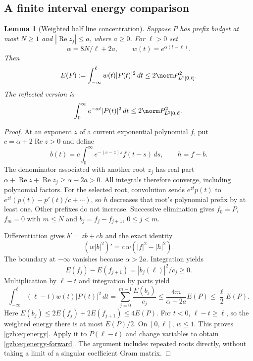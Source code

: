 \documentclass[11pt,a4paper]{article}
\numberwithin{equation}{section}
\newtheorem{lemma}[theorem]{Lemma}
\theoremstyle{definition}\newtheorem{definition}[theorem]{Definition}
\theoremstyle{remark}\newtheorem{remark}[theorem]{Remark}
\DeclareMathOperator{\Rea}{Re}\DeclareMathOperator{\Ima}{Im}
\begin{document}
\subsection{A finite interval energy comparison}
\begin{lemma}[Weighted half line concentration]\label{gzb:lem:energy}
Suppose $P$ has prefix budget at most $N\ge1$ and $|\Rea z_j|\le a$,
where $a\ge0$. For $\ell>0$ set
\[
 \alpha=8N/\ell+2a,\qquad w(t)=e^{\alpha(t-\ell)}.
\]
Then
\begin{equation}\label{gzb:eq:energy}
 E(P):=\int_{-\infty}^{\ell}w(t)|P(t)|^2\,dt
       \le2\norm P_{L^2[0,\ell]}^2.
\end{equation}
The reflected version is
\begin{equation}\label{gzb:eq:energy-forward}
 \int_0^\infty e^{-\alpha t}|P(t)|^2\,dt
       \le2\norm P_{L^2[0,\ell]}^2.
\end{equation}
\end{lemma}
\begin{proof}
At an exponent $z$ of a current exponential polynomial $f$, put
$c=\alpha+2\Rea z>0$ and define
\[
 b(t)=c\int_0^\infty e^{-(c-z)s}f(t-s)\,ds,\qquad h=f-b.
\]
The denominator associated with another root $z_j$ has real part
$\alpha+\Rea z+\Rea z_j\ge\alpha-2a>0$.
All integrals therefore converge, including polynomial factors.
For the selected root, convolution sends $e^{zt}p(t)$ to
$e^{zt}(p(t)-p'(t)/c+\cdots)$, so $h$ decreases that root's polynomial
prefix by at least one. Other prefixes do not increase.
Successive elimination gives $f_0=P$, $f_m=0$ with $m\le N$ and
$b_j=f_j-f_{j+1}$, $0\le j<m$.

Differentiation gives $b'=zb+ch$ and the exact identity
\begin{equation}\label{gzb:eq:energy-identity}
 (w|b|^2)'=c\,w(|f|^2-|h|^2).
\end{equation}
The boundary at $-\infty$ vanishes because $\alpha>2a$.
Integration yields
\[
 E(f_j)-E(f_{j+1})=|b_j(\ell)|^2/c_j\ge0.
\]
Multiplication by $\ell-t$ and integration by parts yield
\[
 \int_{-\infty}^{\ell}(\ell-t)w(t)|P(t)|^2\,dt
   =\sum_{j=0}^{m-1}\frac{E(b_j)}{c_j}
   \le\frac{4m}{\alpha-2a}E(P)\le\frac\ell2E(P).
\]
Here $E(b_j)\le2E(f_j)+2E(f_{j+1})\le4E(P)$.
For $t<0$, $\ell-t\ge\ell$, so the weighted energy there is at most
$E(P)/2$. On $[0,\ell]$, $w\le1$. This proves \eqref{gzb:eq:energy}.
Apply it to $P(\ell-t)$ and change variables to obtain
\eqref{gzb:eq:energy-forward}.
The argument includes repeated roots directly, without taking a limit
of a singular coefficient Gram matrix.
\end{proof}
\end{document}

